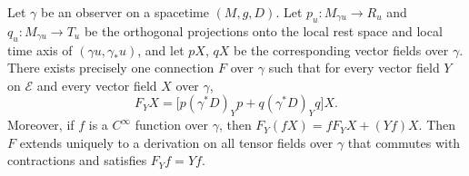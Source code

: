 Let $\gamma$ be an observer on a spacetime $(M, g, D)$. Let $p_u: M_{\gamma u} \to R_u$ and $q_u: M_{\gamma u} \to T_u$ be the orthogonal projections onto the local rest space and local time axis of $(\gamma u, \gamma_* u)$, and let $pX$, $qX$ be the corresponding vector fields over $\gamma$. There exists precisely one connection $F$ over $\gamma$ such that for every vector field $Y$ on $\mathcal{E}$ and every vector field $X$ over $\gamma$,
$$F_Y X = \bigl[p(\gamma^* D)_Y p + q(\gamma^* D)_Y q\bigr] X.$$
Moreover, if $f$ is a $C^\infty$ function over $\gamma$, then $F_Y(fX) = f F_Y X + (Yf)X$. Then $F$ extends uniquely to a derivation on all tensor fields over $\gamma$ that commutes with contractions and satisfies $F_Y f = Yf$.
